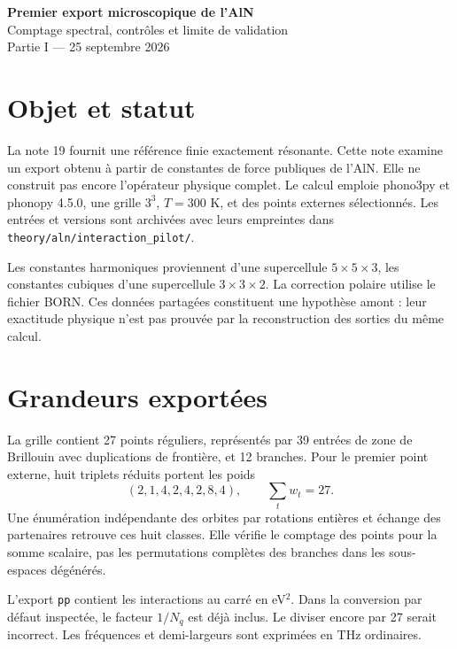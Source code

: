 \documentclass[11pt,a4paper]{article}
\begin{document}
\begin{center}
{\Large\bfseries Premier export microscopique de l'AlN}\\[4pt]
{\normalsize Comptage spectral, contrôles et limite de validation}\\[2pt]
{\small Partie I --- 25 septembre 2026}
\end{center}
\section{Objet et statut}
La note 19 fournit une référence finie exactement résonante. Cette note
examine un export obtenu à partir de constantes de force publiques
de l'AlN. Elle ne construit pas encore l'opérateur physique complet.
Le calcul emploie phono3py et phonopy 4.5.0, une grille $3^3$, $T=300$ K,
et des points externes sélectionnés. Les entrées et versions sont archivées
avec leurs empreintes dans \texttt{theory/aln/interaction\_pilot/}.

Les constantes harmoniques proviennent d'une supercellule $5\times5\times3$,
les constantes cubiques d'une supercellule $3\times3\times2$.
La correction polaire utilise le fichier BORN. Ces données partagées
constituent une hypothèse amont : leur exactitude physique n'est pas
prouvée par la reconstruction des sorties du même calcul.

\section{Grandeurs exportées}
La grille contient 27 points réguliers, représentés par 39 entrées de zone
de Brillouin avec duplications de frontière, et 12 branches.
Pour le premier point externe, huit triplets réduits portent les poids
\[
(2,1,4,2,4,2,8,4),\qquad \sum_t w_t=27.
\]
Une énumération indépendante des orbites par rotations entières et échange
des partenaires retrouve ces huit classes. Elle vérifie le comptage des
points pour la somme scalaire, pas les permutations complètes des branches
dans les sous-espaces dégénérés.

L'export \texttt{pp} contient les interactions au carré en eV$^2$.
Dans la conversion par défaut inspectée, le facteur $1/N_q$ est déjà
inclus. Le diviser encore par 27 serait incorrect.
Les fréquences et demi-largeurs sont exprimées en THz ordinaires.
\end{document}
